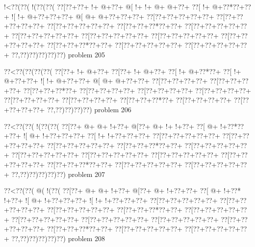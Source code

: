 \vbox{\vbox{\goo
\- !<\0??(\0??(\- !(\0??(\0??(
\0??[\0??+\0??+\- !+\- @+\0??+
\- @[\- !+\- !+\- @+\- @+\0??+
\0??[\- !+\- @+\0??*\0??+\0??+
\- ![\- !+\- @+\0??+\0??+\0??+
\- @[\- @+\- @+\0??+\0??+\0??+
\0??[\0??+\0??+\0??+\0??+\0??+
\0??[\0??+\0??+\0??+\0??+\0??+
\0??[\0??+\0??+\0??+\0??+\0??+
\0??[\0??+\0??+\0??*\0??+\0??+
\0??[\0??+\0??+\0??+\0??+\0??+
\0??[\0??+\0??+\0??+\0??+\0??+
\0??[\0??+\0??+\0??+\0??+\0??+
\0??[\0??+\0??+\0??+\0??+\0??+
\0??[\0??+\0??+\0??+\0??+\0??+
\0??[\0??+\0??+\0??*\0??+\0??+
\0??[\0??+\0??+\0??+\0??+\0??+
\0??[\0??+\0??+\0??+\0??+\0??+
\0??,\0??)\0??)\0??)\0??)\0??)
}
\hfil problem 205\hfil\break
}

\vbox{\vbox{\goo
\0??<\0??(\0??(\0??(\0??(
\0??[\0??+\- !+\- @+\0??+
\0??[\0??+\- !+\- @+\0??+
\0??[\- !+\- @+\0??*\0??+
\0??[\- !+\- @+\0??+\0??+
\- ![\- !+\- @+\0??+\0??+
\- @[\- @+\- @+\0??+\0??+
\0??[\0??+\0??+\0??+\0??+
\0??[\0??+\0??+\0??+\0??+
\0??[\0??+\0??+\0??*\0??+
\0??[\0??+\0??+\0??+\0??+
\0??[\0??+\0??+\0??+\0??+
\0??[\0??+\0??+\0??+\0??+
\0??[\0??+\0??+\0??+\0??+
\0??[\0??+\0??+\0??+\0??+
\0??[\0??+\0??+\0??*\0??+
\0??[\0??+\0??+\0??+\0??+
\0??[\0??+\0??+\0??+\0??+
\0??,\0??)\0??)\0??)\0??)
}
\hfil problem 206\hfil\break
}

\vbox{\vbox{\goo
\0??<\0??(\0??(\- !(\0??(\0??(
\0??[\0??+\- @+\- @+\- !+\0??+
\- @[\0??+\- @+\- !+\- !+\0??+
\0??[\- @+\- !+\0??*\0??+\0??+
\- ![\- @+\- !+\0??+\0??+\0??+
\0??[\- !+\- !+\0??+\0??+\0??+
\0??[\0??+\0??+\0??+\0??+\0??+
\0??[\0??+\0??+\0??+\0??+\0??+
\0??[\0??+\0??+\0??+\0??+\0??+
\0??[\0??+\0??+\0??*\0??+\0??+
\0??[\0??+\0??+\0??+\0??+\0??+
\0??[\0??+\0??+\0??+\0??+\0??+
\0??[\0??+\0??+\0??+\0??+\0??+
\0??[\0??+\0??+\0??+\0??+\0??+
\0??[\0??+\0??+\0??+\0??+\0??+
\0??[\0??+\0??+\0??*\0??+\0??+
\0??[\0??+\0??+\0??+\0??+\0??+
\0??[\0??+\0??+\0??+\0??+\0??+
\0??,\0??)\0??)\0??)\0??)\0??)
}
\hfil problem 207\hfil\break
}

\vbox{\vbox{\goo
\0??<\0??(\0??(\- @(\- !(\0??(
\0??[\0??+\- @+\- @+\- !+\0??+
\- @[\0??+\- @+\- !+\0??+\0??+
\0??[\- @+\- !+\0??*\- !+\0??+
\- ![\- @+\- !+\0??+\0??+\0??+
\- ![\- !+\- !+\0??+\0??+\0??+
\0??[\0??+\0??+\0??+\0??+\0??+
\0??[\0??+\0??+\0??+\0??+\0??+
\0??[\0??+\0??+\0??+\0??+\0??+
\0??[\0??+\0??+\0??*\0??+\0??+
\0??[\0??+\0??+\0??+\0??+\0??+
\0??[\0??+\0??+\0??+\0??+\0??+
\0??[\0??+\0??+\0??+\0??+\0??+
\0??[\0??+\0??+\0??+\0??+\0??+
\0??[\0??+\0??+\0??+\0??+\0??+
\0??[\0??+\0??+\0??*\0??+\0??+
\0??[\0??+\0??+\0??+\0??+\0??+
\0??[\0??+\0??+\0??+\0??+\0??+
\0??,\0??)\0??)\0??)\0??)\0??)
}
\hfil problem 208\hfil\break
}

